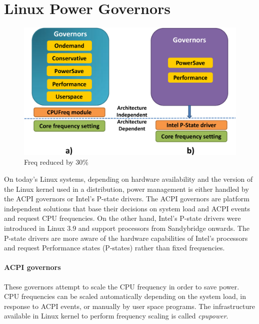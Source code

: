\section{Linux Power Governors}\label{sec:linux-powergov}

\begin{figure}[h]
  \begin{center}
\includegraphics[width=\linewidth]{figs/gov-crop.pdf}
  \end{center}
  \vspace{-0.1in}
  \caption{Freq reduced by 30\%}
	\label{fig:gov}
\end{figure}
\fi

On today's Linux systems, depending on hardware availability and the version of the Linux kernel used in a distribution, power management 
is either handled by the ACPI governors or Intel's P-state drivers. The ACPI governors are platform independent solutions that base their decisions 
on system load and ACPI events and request CPU frequencies. On the other hand, Intel's P-state drivers were introduced in Linux 3.9 and support processors from Sandybridge onwards. 
The P-state drivers are more aware of the hardware capabilities of Intel's processors and request Performance states (P-states) rather than fixed frequencies.

\paragraph{ACPI governors}
These governors attempt to scale the CPU frequency in order to save power. CPU frequencies can be scaled automatically 
depending on the system load, in response to ACPI events, or manually by user space programs. The infrastructure available in Linux kernel to perform 
frequency scaling is called \emph{cpupower}.  

